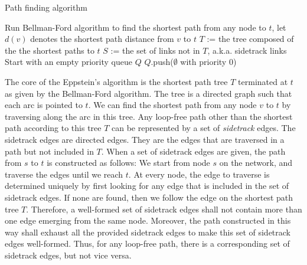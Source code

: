 \documentclass[conference]{IEEEtran}
\begin{document}
\begin{algorithm}
\caption{Path finding algorithm}
Run Bellman-Ford algorithm to find the shortest path from any node to $t$,
let $d(v)$ denotes the shortest path distance from $v$ to $t$\;
$T$ := the tree composed of the the shortest paths to $t$\;
$S$ := the set of links not in $T$, a.k.a. sidetrack links\;
Start with an empty priority queue $Q$\;
$Q$.push($\emptyset$ with priority 0)\;
\end{algorithm}

The core of the Eppstein's algorithm is the shortest path tree $T$ terminated
at $t$ as given by the Bellman-Ford algorithm. The tree is a directed graph
such that each arc is pointed to $t$. We can find the shortest path from any
node $v$ to $t$ by traversing along the arc in this tree. Any loop-free path
other than the shortest path according to this tree $T$ can be represented by a
set of \emph{sidetrack} edges. The sidetrack edges are directed edges. They are
the edges that are traversed in a path but not included in $T$. When a set of
sidetrack edges are given, the path from $s$ to $t$ is constructed as follows:
We start from node $s$ on the network, and traverse the edges until we reach
$t$. At every node, the edge to traverse is determined uniquely by first
looking for any edge that is included in the set of sidetrack edges. If none
are found, then we follow the edge on the shortest path tree $T$. Therefore, a
well-formed set of sidetrack edges shall not contain more than one edge
emerging from the same node. Moreover, the path constructed in this way shall
exhaust all the provided sidetrack edges to make this set of sidetrack edges
well-formed. Thus, for any loop-free path, there is a corresponding set of
sidetrack edges, but not vice versa.
\end{document}
